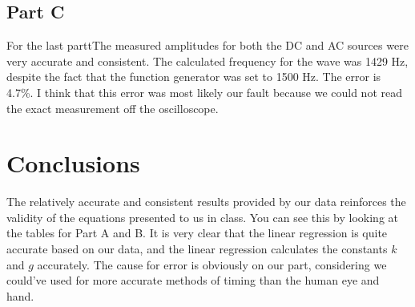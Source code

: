 \documentclass[titlepage]{article}
\begin{document}
\subsection{Part C}\label{sub:part_c}
For the last parttThe measured amplitudes for both the DC and AC sources were very accurate and consistent. The calculated frequency for the wave was 1429 Hz, despite the fact that the function generator was set to 1500 Hz. The error is 4.7\%. I think that this error was most likely our fault because we could not read the exact measurement off the oscilloscope.

\section{Conclusions}\label{sec:conclusions}
The relatively accurate and consistent results provided by our data reinforces the validity of the equations presented to us in class. You can see this by looking at the tables for Part A and B. It is very clear that the linear regression is quite accurate based on our data, and the linear regression calculates the constants $k$ and $g$ accurately. The cause for error is obviously on our part, considering we could've used for more accurate methods of timing than the human eye and hand.
\end{document}
